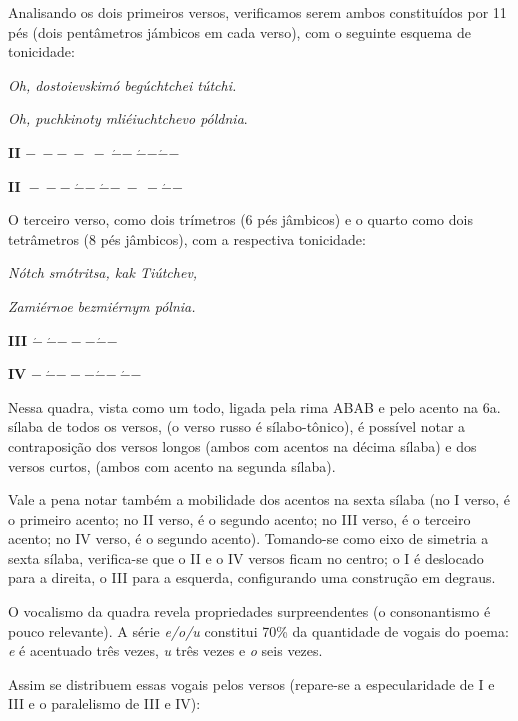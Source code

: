 Analisando os dois primeiros versos, verificamos serem ambos
constituídos por 11 pés (dois pentâmetros jámbicos em cada verso), com o
seguinte esquema de tonicidade:

\emph{Oh, dostoievskimó begúchtchei tútchi.}

\emph{Oh, puchkinoty mliéiuchtchevo póldnia}.

\textbf{II}
\(\mathbf{- \  - - \  - \  - \ }\acute{\mathbf{-}}\mathbf{- \ }\acute{\mathbf{-}}\mathbf{-}\acute{\mathbf{-}}\mathbf{-}\)

\textbf{II~}\(\mathbf{- \  - - \ }\acute{\mathbf{-}}\mathbf{- \ }\acute{\mathbf{-}}\mathbf{- \  - \  -}\acute{\mathbf{-}}\mathbf{-}\)

O terceiro verso, como dois trímetros (6 pés jâmbicos) e o quarto como
dois tetrâmetros (8 pés jâmbicos), com a respectiva tonicidade:

\emph{Nótch smótritsa, kak Tiútchev,}

\emph{Zamiérnoe bezmiérnym pólnia.}

\textbf{III}
\(\acute{\mathbf{-}}\mathbf{\ }\acute{\mathbf{-}}\mathbf{- - -}\acute{\mathbf{-}}\mathbf{- \ }\)

\textbf{IV}
\(\mathbf{- \ }\acute{\mathbf{-}}\mathbf{- - -}\acute{\mathbf{-}}\mathbf{- \ }\acute{\mathbf{-}}\mathbf{- \ }\)\textbf{\\
}

Nessa quadra, vista como um todo, ligada pela rima ABAB e pelo acento na
6a. sílaba de todos os versos, (o verso russo é sílabo-tônico), é
possível notar a contraposição dos versos longos (ambos com acentos na
décima sílaba) e dos versos curtos, (ambos com acento na segunda
sílaba).

Vale a pena notar também a mobilidade dos acentos na sexta sílaba (no I
verso, é o primeiro acento; no II verso, é o segundo acento; no III
verso, é o terceiro acento; no IV verso, é o segundo acento). Tomando-se
como eixo de simetria a sexta sílaba, verifica-se que o II e o IV versos
ficam no centro; o I é deslocado para a direita, o III para a esquerda,
configurando uma construção em degraus.

O vocalismo da quadra revela propriedades surpreendentes (o
consonantismo é pouco relevante). A série \emph{e/o/u} constitui 70\% da
quantidade de vogais do poema: \emph{e} é acentuado três vezes, \emph{u}
três vezes e \emph{o} seis vezes.

Assim se distribuem essas vogais pelos versos (repare-se a
especularidade de I e III e o paralelismo de III e IV):

